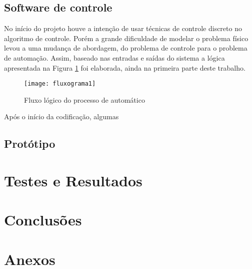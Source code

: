 \documentclass[a4paper,11pt]{article}
\begin{document}
%
\subsection{Software de controle}
\label{sec:software}
No início do projeto houve a intenção de usar técnicas de controle discreto no algoritmo de controle.
Porém a grande dificuldade de modelar o problema físico levou a uma mudança de
abordagem, do problema de controle para o problema de automação. Assim, baseado
nas entradas e saídas do sistema a lógica apresentada na Figura
\ref{fig:fluxograma1} foi elaborada, ainda na primeira parte deste trabalho.
\begin{figure}[ht]
 \begin{center}
  \texttt{[image: fluxograma1]}
 \end{center}
 \caption{Fluxo lógico do processo de automático}
 \label{fig:fluxograma1}
\end{figure}
Após o início da codificação, algumas 

 
%
\subsection{Protótipo}
\label{sec:prototipo}


\pagebreak
%
\section{Testes e Resultados}
\label{sec:resultados}

\pagebreak
%
\section{Conclusões}
\label{sec:conclusoes}


\pagebreak
%
\section{Anexos}
\label{sec:anexos}

%
\end{document}
